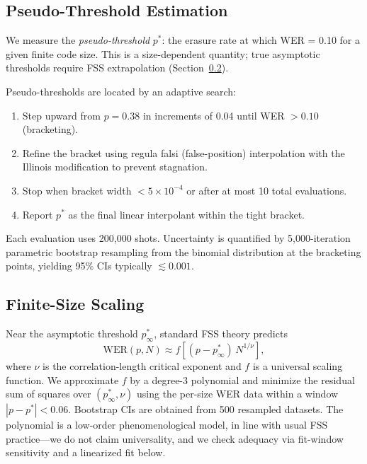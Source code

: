 \documentclass[a4paper]{quantumarticle}
\begin{document}
\subsection{Pseudo-Threshold Estimation}

We measure the \emph{pseudo-threshold} $p^*$: the erasure rate at which WER = 0.10 for a given
finite code size.
This is a size-dependent quantity; true asymptotic thresholds require FSS extrapolation
(Section~\ref{sec:fss}).

Pseudo-thresholds are located by an adaptive search:
\begin{enumerate}
    \item Step upward from $p=0.38$ in increments of 0.04 until WER $> 0.10$ (bracketing).
    \item Refine the bracket using regula falsi (false-position) interpolation with the Illinois
          modification to prevent stagnation.
    \item Stop when bracket width $< 5\times10^{-4}$ or after at most 10 total evaluations.
    \item Report $p^*$ as the final linear interpolant within the tight bracket.
\end{enumerate}
Each evaluation uses 200{,}000 shots.
Uncertainty is quantified by 5{,}000-iteration parametric bootstrap resampling from the
binomial distribution at the bracketing points, yielding 95\% CIs typically $\lesssim 0.001$.

\subsection{Finite-Size Scaling}\label{sec:fss}

Near the asymptotic threshold $p^*_\infty$, standard FSS theory \cite{dennis2002topological,wang2003quantum} predicts
\begin{equation}
    \mathrm{WER}(p, N) \approx f\!\left[(p - p^*_\infty)\, N^{1/\nu}\right],
\end{equation}
where $\nu$ is the correlation-length critical exponent and $f$ is a universal scaling function.
We approximate $f$ by a degree-3 polynomial and minimize the residual sum of squares over
$(p^*_\infty, \nu)$ using the per-size WER data within a window $|p - p^*| < 0.06$.
Bootstrap CIs are obtained from 500 resampled datasets.
The polynomial is a low-order phenomenological model, in line with usual FSS practice---we
do not claim universality, and we check adequacy via fit-window sensitivity and a
linearized fit below.
\end{document}
